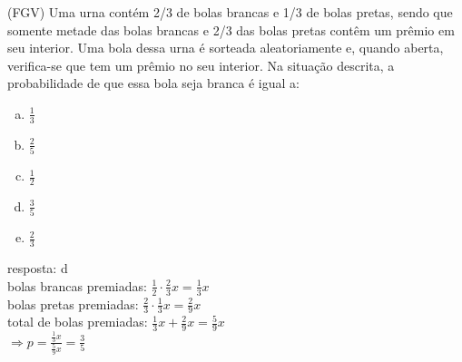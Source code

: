 \begin{ex}
    (FGV) Uma urna contém 2/3 de bolas brancas e 1/3 de bolas pretas, sendo que somente metade das bolas brancas e 2/3 das bolas pretas contêm um prêmio em seu interior. Uma bola dessa urna é sorteada aleatoriamente e, quando aberta, verifica-se que tem um prêmio no seu interior. Na situação descrita, a probabilidade de que essa bola seja branca é igual a:
    \begin{enumerate} [(a)]
        \item $\frac{1}{3}$
        \item $\frac{2}{5}$
        \item $\frac{1}{2}$
        \item $\frac{3}{5}$
        \item $\frac{2}{3}$
    \end{enumerate}
      \begin{sol}
      resposta: d \\
      bolas brancas premiadas: $\frac{1}{2}\cdot\frac{2}{3}x=\frac{1}{3}x$\\
      bolas pretas premiadas: $\frac{2}{3}\cdot\frac{1}{3}x=\frac{2}{9}x$\\
      total de bolas premiadas: $\frac{1}{3}x+\frac{2}{9}x=\frac{5}{9}x$ \\
      $\Longrightarrow p = \frac{\frac{1}{3}x}{\frac{5}{9}x}=\frac{3}{5}$
      \end{sol}
 \end{ex}